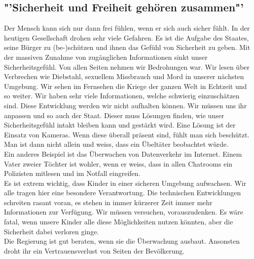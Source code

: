 \subsection{"'Sicherheit und Freiheit gehören zusammen"'}
Der Mensch kann sich nur dann frei fühlen, wenn er sich auch sicher 
fühlt. In der heutigen Gesellschaft drohen sehr viele Gefahren. 
Es ist die Aufgabe des Staates, seine Bürger zu (be-)schützen und ihnen 
das Gefühl von Sicherheit zu geben. Mit der massiven Zunahme von 
zugänglichen Informationen sinkt unser Sicherheitsgefühl. Von allen 
Seiten nehmen wir Bedrohungen war. Wir lesen über Verbrechen wie 
Diebstahl, sexuellem Missbrauch und Mord in unserer nächsten 
Umgebung. Wir sehen im Fernsehen die Kriege der ganzen Welt in Echtzeit 
und so weiter. Wir haben sehr viele Informationen, welche schwierig 
einzuschätzen sind. Diese Entwicklung werden wir nicht aufhalten 
können. Wir müssen uns ihr anpassen und so auch der Staat. Dieser muss 
Lösungen finden, wie unser Sicherheitsgefühl intakt bleiben kann und 
gestärkt wird. Eine Lösung ist der Einsatz von 
Kameras. Wenn diese überall präsent sind, fühlt man sich beschützt. Man 
ist dann nicht allein und weiss, dass ein Übeltäter beobachtet würde.\\
Ein anderes Beispiel ist das Überwachen von Datenverkehr im Internet. 
Einem Vater zweier Töchter ist wohler, wenn er weiss, dass in 
allen Chatrooms ein Polizisten mitlesen und im Notfall 
eingreifen.\\
Es ist extrem wichtig, dass Kinder in einer sicheren Umgebung 
aufwachsen. Wir alle tragen hier eine besondere Verantwortung. Die 
technischen Entwicklungen schreiten rasant voran, es stehen in immer 
kürzerer Zeit immer mehr Informationen zur Verfügung. Wir müssen 
versuchen, vorauszudenken. Es wäre fatal, wenn unsere Kinder alle diese 
Möglichkeiten nutzen könnten, aber die Sicherheit dabei verloren ginge.\\
Die Regierung ist gut beraten, wenn sie die Überwachung 
ausbaut. Ansonsten droht ihr ein Vertrauensverlust von Seiten der 
Bevölkerung.

